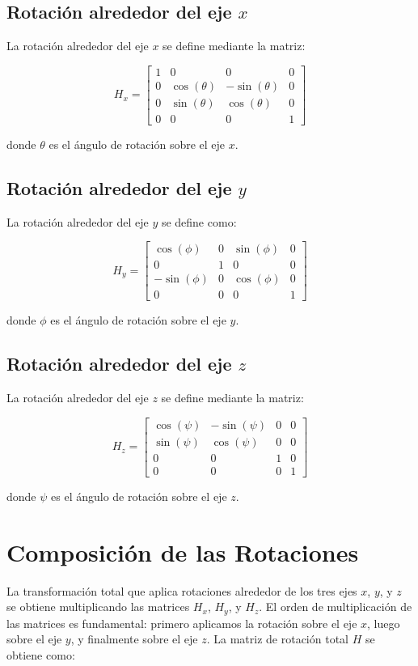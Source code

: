 \documentclass[a4paper, 10pt]{article}
\begin{document}
\subsection{Rotación alrededor del eje \(x\)}
La rotación alrededor del eje \(x\) se define mediante la matriz:

\[
H_x = \begin{bmatrix}
1 & 0 & 0 & 0 \\
0 & \cos(\theta) & -\sin(\theta) & 0 \\
0 & \sin(\theta) & \cos(\theta) & 0 \\
0 & 0 & 0 & 1
\end{bmatrix}
\]

donde \( \theta \) es el ángulo de rotación sobre el eje \(x\).

\subsection{Rotación alrededor del eje \(y\)}
La rotación alrededor del eje \(y\) se define como:

\[
H_y = \begin{bmatrix}
\cos(\phi) & 0 & \sin(\phi) & 0 \\
0 & 1 & 0 & 0 \\
-\sin(\phi) & 0 & \cos(\phi) & 0 \\
0 & 0 & 0 & 1
\end{bmatrix}
\]

donde \( \phi \) es el ángulo de rotación sobre el eje \(y\).

\subsection{Rotación alrededor del eje \(z\)}
La rotación alrededor del eje \(z\) se define mediante la matriz:

\[
H_z = \begin{bmatrix}
\cos(\psi) & -\sin(\psi) & 0 & 0 \\
\sin(\psi) & \cos(\psi) & 0 & 0 \\
0 & 0 & 1 & 0 \\
0 & 0 & 0 & 1
\end{bmatrix}
\]

donde \( \psi \) es el ángulo de rotación sobre el eje \(z\).

\section{Composición de las Rotaciones}
La transformación total que aplica rotaciones alrededor de los tres ejes \(x\), \(y\), y \(z\) se obtiene multiplicando las matrices \( H_x \), \( H_y \), y \( H_z \). El orden de multiplicación de las matrices es fundamental: primero aplicamos la rotación sobre el eje \(x\), luego sobre el eje \(y\), y finalmente sobre el eje \(z\). La matriz de rotación total \(H\) se obtiene como:
\end{document}
